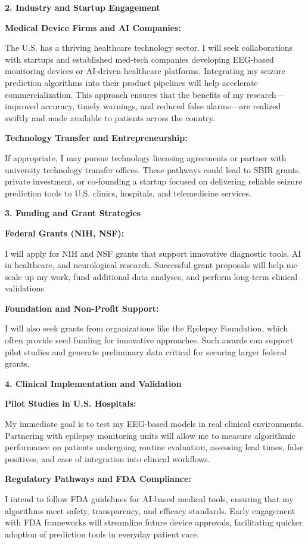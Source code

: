 \documentclass{article}
\begin{document}
{\bf 2. Industry and Startup Engagement }

{\bf Medical Device Firms and AI Companies: }

The U.S. has a thriving healthcare technology sector. I will seek collaborations with startups and established med-tech companies developing EEG-based monitoring devices or AI-driven healthcare platforms. Integrating my seizure prediction algorithms into their product pipelines will help accelerate commercialization. This approach ensures that the benefits of my research—improved accuracy, timely warnings, and reduced false alarms—are realized swiftly and made available to patients across the country.

{\bf Technology Transfer and Entrepreneurship: } 

If appropriate, I may pursue technology licensing agreements or partner with university technology transfer offices. These pathways could lead to SBIR grants, private investment, or co-founding a startup focused on delivering reliable seizure prediction tools to U.S. clinics, hospitals, and telemedicine services.

{\bf 3. Funding and Grant Strategies }

{\bf Federal Grants (NIH, NSF): }

I will apply for NIH and NSF grants that support innovative diagnostic tools, AI in healthcare, and neurological research. Successful grant proposals will help me scale up my work, fund additional data analyses, and perform long-term clinical validations.

{\bf Foundation and Non-Profit Support: }

I will also seek grants from organizations like the Epilepsy Foundation, which often provide seed funding for innovative approaches. Such awards can support pilot studies and generate preliminary data critical for securing larger federal grants.

{\bf 4. Clinical Implementation and Validation }

{\bf Pilot Studies in U.S. Hospitals: }

My immediate goal is to test my EEG-based models in real clinical environments. Partnering with epilepsy monitoring units will allow me to measure algorithmic performance on patients undergoing routine evaluation, assessing lead times, false positives, and ease of integration into clinical workflows.

{\bf Regulatory Pathways and FDA Compliance: }

I intend to follow FDA guidelines for AI-based medical tools, ensuring that my algorithms meet safety, transparency, and efficacy standards. Early engagement with FDA frameworks will streamline future device approvals, facilitating quicker adoption of prediction tools in everyday patient care.
\end{document}
